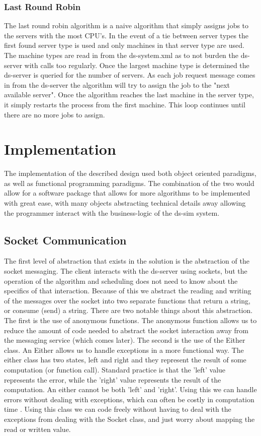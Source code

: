 \documentclass[12pt, letterpaper]{article}
\begin{document}
\subsubsection*{Last Round Robin}
The last round robin algorithm is a naive algorithm that simply assigns jobs to the servers with the most CPU's.
In the event of a tie between server types the first found server type is used and only machines in that server type are used.
The machine types are read in from the ds-system.xml as to not burden the ds-server with calls too regularly.
Once the largest machine type is determined the ds-server is queried for the number of servers. 
As each job request message comes in from the ds-server the algorithm will try to assign the job to the "next available server".
Once the algorithm reaches the last machine in the server type, it simply restarts the process from the first machine.
This loop continues until there are no more jobs to assign.

\section*{Implementation}
The implementation of the described design used both object oriented paradigms, as well as functional programming paradigms.
The combination of the two would allow for a software package that allows for more algorithms to be implemented with great ease, with many objects abstracting technical details away allowing the programmer interact with the business-logic of the ds-sim system.
\subsection*{Socket Communication}
The first level of abstraction that exists in the solution is the abstraction of the socket messaging. 
The client interacts with the ds-server using sockets, but the operation of the algorithm and scheduling does not need to know about the specifics of that interaction.
\newline
Because of this we abstract the reading and writing of the messages over the socket into two separate functions that return a string, or consume (send) a string.
There are two notable things about this abstraction. The first is the use of anonymous functions.
The anonymous function allows us to reduce the amount of code needed to abstract the socket interaction away from the messaging service (which comes later). 
The second is the use of the Either class. An Either allows us to handle exceptions in a more functional way\cite{bly_2018}.
The either class has two states, left and right and they represent the result of some computation (or function call). 
Standard practice is that the 'left' value represents the error, while the 'right' value represents the result of the computation.
An either cannot be both 'left' and 'right'. Using this we can handle errors without dealing with exceptions, which can often be costly in computation time \cite{maurer_2013}. 
Using this class we can code freely without having to deal with the exceptions from dealing with the Socket class, and just worry about mapping the read or written value.
\end{document}
